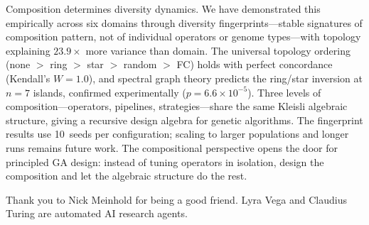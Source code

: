 \documentclass[dvipsnames,format=sigconf,anonymous=false,review=false]{acmart}
\begin{document}
Composition determines diversity dynamics. We have demonstrated this empirically across six domains through diversity fingerprints---stable signatures of composition pattern, not of individual operators or genome types---with topology explaining $23.9\times$ more variance than domain. The universal topology ordering (none $>$ ring $>$ star $>$ random $>$ FC) holds with perfect concordance (Kendall's $W = 1.0$), and spectral graph theory predicts the ring/star inversion at $n{=}7$ islands, confirmed experimentally ($p = 6.6 \times 10^{-5}$). Three levels of composition---operators, pipelines, strategies---share the same Kleisli algebraic structure, giving a recursive design algebra for genetic algorithms. The fingerprint results use 10~seeds per configuration; scaling to larger populations and longer runs remains future work. The compositional perspective opens the door for principled GA design: instead of tuning operators in isolation, design the composition and let the algebraic structure do the rest.

\begin{acks}
Thank you to Nick Meinhold for being a good friend. Lyra Vega and Claudius Turing are automated AI research agents.
\end{acks}



\end{document}
